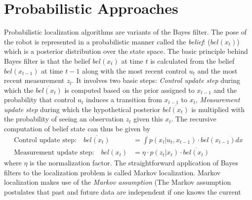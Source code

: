 \section{Probabilistic Approaches}
\label{ssec:prob_approaches}
	Probabilistic localization algorithms are variants of the Bayes filter\cite{Thrun2005}. The pose of the robot is represented in a probabilistic manner called the \emph{belief}: ($bel(x_t)$) which is a posterior distribution over the state space. The basic principle behind Bayes filter is that the belief $bel(x_t)$ at time $t$ is calculated from the belief $bel(x_{t-1})$ at time $t-1$ along with the most recent control $u_t$ and the most recent measurement $z_t$. It involves two basic steps: \emph{Control update step} during which the $\overline{bel(x_t)}$ is computed based on the prior assigned to $x_{t-1}$ and the probability that control $u_t$ induces a transition from $x_{t-1}$ to $x_t$, \emph{Measurement update step} during which the hypothetical posterior $\overline{bel(x_t)}$ is multiplied with the probability of seeing an observation $z_t$ given this $x_t$. The recursive computation of belief state can thus be given by
	\begin{align*}
	\text{Control update step:}\quad \overline{bel(x_t)} &= \int p(x_t\vert u_t,x_{t-1})\cdot bel(x_{t-1}) dx \\
	\text{Measurement update step:}\quad {bel(x_t)} &= \eta\cdot p(z_t\vert x_{t})\cdot \overline{bel(x_t)}
	\end{align*}
	where $\eta$ is the normalization factor.
	The straightforward application of Bayes filters to the localization problem is called Markov localization. Markov localization makes use of the \emph{Markov assumption} (The Markov
assumption postulates that past and future data are independent if one knows the current
